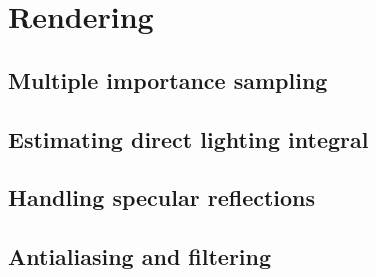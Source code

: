 \section{Rendering}

\subsection{Multiple importance sampling}

\subsection{Estimating direct lighting integral}

\subsection{Handling specular reflections}

\subsection{Antialiasing and filtering}



